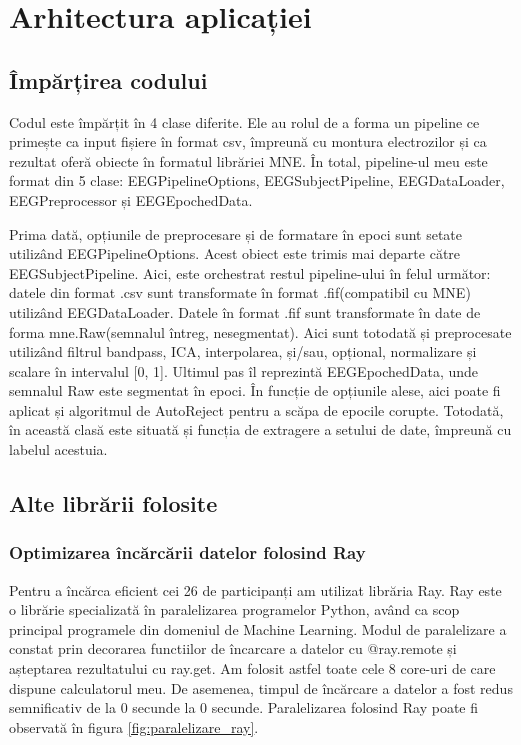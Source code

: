 \def\timpInainteDeRay{0}
\def\timpDupaRay{0}

\chapter{Arhitectura aplicației}
\section{Împărțirea codului}
Codul este împărțit în 4 clase diferite. Ele au rolul de a forma un pipeline ce primește ca input fișiere în format csv, împreună cu montura electrozilor și ca rezultat oferă obiecte în formatul librăriei MNE\cite{MNE}.
În total, pipeline-ul meu este format din 5 clase: EEGPipelineOptions, EEGSubjectPipeline, EEGDataLoader, EEGPreprocessor și EEGEpochedData. 

Prima dată, opțiunile de preprocesare și de formatare în epoci sunt setate utilizând EEGPipelineOptions. Acest obiect este trimis mai departe către EEGSubjectPipeline. Aici, este orchestrat restul pipeline-ului în felul următor: datele din format .csv sunt transformate în format .fif(compatibil cu MNE\cite{MNE}) utilizând EEGDataLoader. Datele în format .fif sunt transformate în date de forma mne.Raw(semnalul întreg, nesegmentat). Aici sunt totodată și preprocesate utilizând filtrul bandpass, ICA, interpolarea, și/sau, opțional, normalizare și scalare în intervalul [0, 1].  Ultimul pas îl reprezintă EEGEpochedData, unde semnalul Raw este segmentat în epoci. În funcție de opțiunile alese, aici poate fi aplicat și algoritmul de AutoReject\cite{AutoReject} pentru a scăpa de epocile corupte. Totodată, în această clasă este situată și funcția de extragere a setului de date, împreună cu labelul acestuia.


\section{Alte librării folosite}
\subsection{Optimizarea încărcării datelor folosind Ray}
Pentru a încărca eficient cei 26 de participanți am utilizat librăria Ray\cite{Ray}. Ray este o librărie specializată în paralelizarea programelor Python, având ca scop principal programele din domeniul de Machine Learning. Modul de paralelizare a constat prin decorarea functiilor de încarcare a datelor cu @ray.remote și așteptarea rezultatului cu ray.get. Am folosit astfel toate cele 8 core-uri de care dispune calculatorul meu. De asemenea, timpul de încărcare a datelor a fost redus semnificativ de la $\timpInainteDeRay$ secunde la $\timpDupaRay$ secunde. Paralelizarea folosind Ray poate fi observată în figura \ref{fig:paralelizare_ray}.

